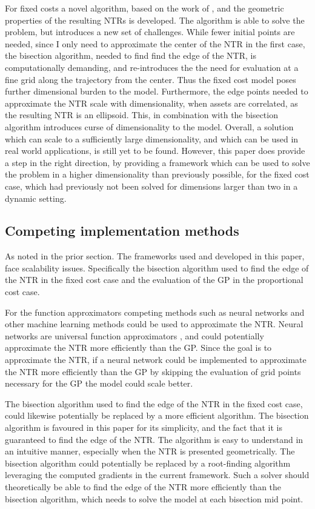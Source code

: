 \documentclass[11pt]{article}
\begin{document}
For fixed costs a novel algorithm, based on the work of \autocite{Scheidegger2023}, and the geometric properties
of the resulting \ac{NTR}s is developed. The algorithm is able to solve the problem, but introduces a new set of challenges.
While fewer initial points are needed, since I only need to approximate the center of the \ac{NTR} in the first case,
the bisection algorithm, needed to find find the edge of the \ac{NTR}, is computationally demanding, and re-introduces the the need
for evaluation at a fine grid along the trajectory from the center. Thus the fixed cost model poses further dimensional burden to the model.
Furthermore, the edge points needed to approximate the \ac{NTR} scale with dimensionality,
when assets are correlated, as the resulting \ac{NTR} is an ellipsoid.
This, in combination with the bisection algorithm introduces curse of dimensionality to the model.
Overall, a solution which can scale to a sufficiently large dimensionality, and which can be used in real world applications, is still yet to be found.
However, this paper does provide a step in the right direction, by providing a framework which can be used to solve the problem in a higher dimensionality than previously possible,
for the fixed cost case, which had previously not been solved for dimensions larger than two in a dynamic setting.
\subsection{Competing implementation methods} \label{Subsection: Competing solution methods}
As noted in the prior section. The frameworks used and developed in this paper, face scalability issues.
Specifically the bisection algorithm used to find the edge of the \ac{NTR} in the fixed cost case and the evaluation of the \ac{GP} in the proportional cost case.

For the function approximators competing methods such as neural networks and other machine learning methods could be used to approximate the \ac{NTR}.
Neural networks are universal function approximators \autocite{cybenko1989approximation}, and could potentially approximate the \ac{NTR} more efficiently than the \ac{GP}.
Since the goal is to approximate the \ac{NTR}, if a neural network could be implemented to approximate the \ac{NTR} more efficiently than the \ac{GP}
by skipping the evaluation of grid points necessary for the \ac{GP} the model could scale better.

The bisection algorithm used to find the edge of the \ac{NTR} in the fixed cost case, could likewise potentially be replaced by a more efficient algorithm.
The bisection algorithm is favoured in this paper for its simplicity, and the fact that it is guaranteed to find the edge of the \ac{NTR}.
The algorithm is easy to understand in an intuitive manner, especially when the \ac{NTR} is presented geometrically.
The bisection algorithm could potentially be replaced by a root-finding algorithm leveraging the computed gradients in the current framework.
Such a solver should theoretically be able to find the edge of the \ac{NTR} more efficiently than the bisection algorithm, which needs to solve the model at each bisection mid point. 
\end{document}
